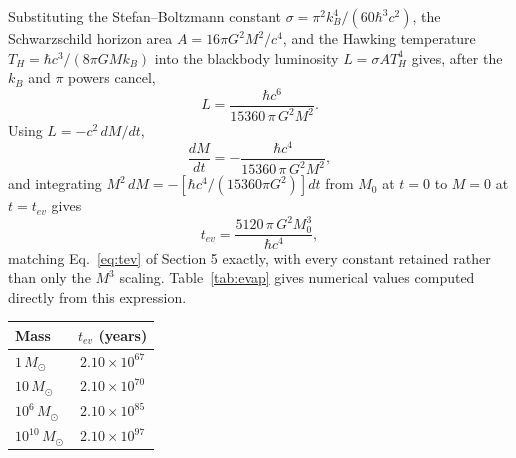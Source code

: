 \documentclass[11pt]{article}
\begin{document}
Substituting the Stefan--Boltzmann constant $\sigma = \pi^2k_B^4/(60\hbar^3c^2)$, the Schwarzschild horizon area $A=16\pi G^2M^2/c^4$, and the Hawking temperature $T_H = \hbar c^3/(8\pi GMk_B)$ into the blackbody luminosity $L=\sigma A T_H^4$ gives, after the $k_B$ and $\pi$ powers cancel,
\begin{equation}
L = \frac{\hbar c^6}{15360\,\pi\, G^2 M^2}.
\end{equation}
Using $L = -c^2\,dM/dt$,
\begin{equation}
\frac{dM}{dt} = -\frac{\hbar c^4}{15360\,\pi\, G^2 M^2},
\end{equation}
and integrating $M^2\,dM = -\left[\hbar c^4/(15360\pi G^2)\right]dt$ from $M_0$ at $t=0$ to $M=0$ at $t=t_{ev}$ gives
\begin{equation}
t_{ev} = \frac{5120\,\pi\, G^2 M_0^3}{\hbar c^4},
\end{equation}
matching Eq.~\eqref{eq:tev} of Section 5 exactly, with every constant retained rather than only the $M^3$ scaling. Table~\ref{tab:evap} gives numerical values computed directly from this expression.

\begin{center}
\begin{tabular}{lc}
\toprule
Mass & $t_{ev}$ (years) \\
\midrule
$1\,M_\odot$ & $2.10\times10^{67}$ \\
$10\,M_\odot$ & $2.10\times10^{70}$ \\
$10^6\,M_\odot$ & $2.10\times10^{85}$ \\
$10^{10}\,M_\odot$ & $2.10\times10^{97}$ \\
\bottomrule
\end{tabular}
\label{tab:evap}
\end{center}
\end{document}
